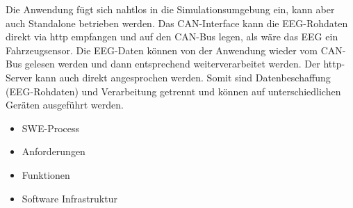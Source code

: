 Die Anwendung fügt sich nahtlos in die Simulationsumgebung ein, kann aber auch Standalone betrieben werden. Das CAN-Interface kann die EEG-Rohdaten direkt via http empfangen und auf den CAN-Bus legen, als wäre das EEG ein Fahrzeugsensor. Die EEG-Daten können von der Anwendung wieder vom CAN-Bus gelesen werden und dann entsprechend weiterverarbeitet werden. Der http-Server kann auch direkt angesprochen werden. Somit sind Datenbeschaffung (EEG-Rohdaten) und Verarbeitung getrennt und können auf unterschiedlichen Geräten ausgeführt werden.

\begin{itemize}
\item SWE-Process
\item Anforderungen
\item Funktionen
\item Software Infrastruktur
\end{itemize} 